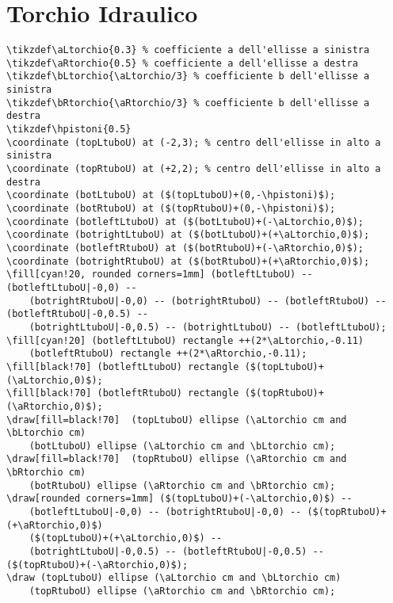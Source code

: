 \documentclass[italian, a4paper]{article}
\begin{document}
\newpage\section{Torchio Idraulico}

\begin{Verbatim}
\tikzdef\aLtorchio{0.3} % coefficiente a dell'ellisse a sinistra
\tikzdef\aRtorchio{0.5} % coefficiente a dell'ellisse a destra
\tikzdef\bLtorchio{\aLtorchio/3} % coefficiente b dell'ellisse a sinistra
\tikzdef\bRtorchio{\aRtorchio/3} % coefficiente b dell'ellisse a destra
\tikzdef\hpistoni{0.5}
\coordinate (topLtuboU) at (-2,3); % centro dell'ellisse in alto a sinistra
\coordinate (topRtuboU) at (+2,2); % centro dell'ellisse in alto a destra
\coordinate (botLtuboU) at ($(topLtuboU)+(0,-\hpistoni)$);
\coordinate (botRtuboU) at ($(topRtuboU)+(0,-\hpistoni)$);
\coordinate (botleftLtuboU) at ($(botLtuboU)+(-\aLtorchio,0)$);
\coordinate (botrightLtuboU) at ($(botLtuboU)+(+\aLtorchio,0)$);
\coordinate (botleftRtuboU) at ($(botRtuboU)+(-\aRtorchio,0)$);
\coordinate (botrightRtuboU) at ($(botRtuboU)+(+\aRtorchio,0)$);
\fill[cyan!20, rounded corners=1mm] (botleftLtuboU) -- (botleftLtuboU|-0,0) --
    (botrightRtuboU|-0,0) -- (botrightRtuboU) -- (botleftRtuboU) -- (botleftRtuboU|-0,0.5) --
    (botrightLtuboU|-0,0.5) -- (botrightLtuboU) -- (botleftLtuboU);
\fill[cyan!20] (botleftLtuboU) rectangle ++(2*\aLtorchio,-0.11)
    (botleftRtuboU) rectangle ++(2*\aRtorchio,-0.11);
\fill[black!70] (botleftLtuboU) rectangle ($(topLtuboU)+(\aLtorchio,0)$);
\fill[black!70] (botleftRtuboU) rectangle ($(topRtuboU)+(\aRtorchio,0)$);
\draw[fill=black!70]  (topLtuboU) ellipse (\aLtorchio cm and \bLtorchio cm)
    (botLtuboU) ellipse (\aLtorchio cm and \bLtorchio cm);
\draw[fill=black!70]  (topRtuboU) ellipse (\aRtorchio cm and \bRtorchio cm)
    (botRtuboU) ellipse (\aRtorchio cm and \bRtorchio cm);
\draw[rounded corners=1mm] ($(topLtuboU)+(-\aLtorchio,0)$) --
    (botleftLtuboU|-0,0) -- (botrightRtuboU|-0,0) -- ($(topRtuboU)+(+\aRtorchio,0)$)
    ($(topLtuboU)+(+\aLtorchio,0)$) --
    (botrightLtuboU|-0,0.5) -- (botleftRtuboU|-0,0.5) -- ($(topRtuboU)+(-\aRtorchio,0)$);
\draw (topLtuboU) ellipse (\aLtorchio cm and \bLtorchio cm)
    (topRtuboU) ellipse (\aRtorchio cm and \bRtorchio cm);
\end{Verbatim}
\end{document}
